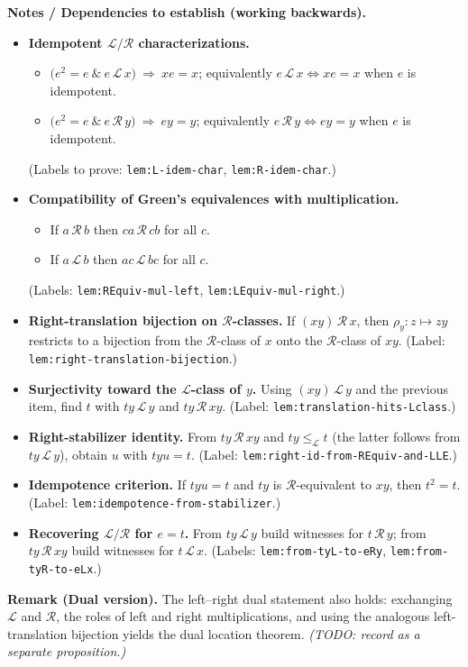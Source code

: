 \noindent\textbf{Notes / Dependencies to establish (working backwards).}
\begin{itemize}
  \item \textbf{Idempotent \(\mathcal L/\mathcal R\) characterizations.}
    \begin{itemize}
      \item \(\bigl(e^2=e \ \&\  e \,\mathcal L\, x\bigr)\ \Rightarrow\ x e = x\); equivalently \(e \,\mathcal L\, x \iff x e = x\) when \(e\) is idempotent.
      \item \(\bigl(e^2=e \ \&\  e \,\mathcal R\, y\bigr)\ \Rightarrow\ e y = y\); equivalently \(e \,\mathcal R\, y \iff e y = y\) when \(e\) is idempotent.
    \end{itemize}
    (Labels to prove: \texttt{lem:L-idem-char}, \texttt{lem:R-idem-char}.)
  \item \textbf{Compatibility of Green’s equivalences with multiplication.}
    \begin{itemize}
      \item If \(a \,\mathcal R\, b\) then \(c a \,\mathcal R\, c b\) for all \(c\).
      \item If \(a \,\mathcal L\, b\) then \(a c \,\mathcal L\, b c\) for all \(c\).
    \end{itemize}
    (Labels: \texttt{lem:REquiv-mul-left}, \texttt{lem:LEquiv-mul-right}.)
  \item \textbf{Right-translation bijection on \(\mathcal R\)-classes.}  
    If \((xy)\,\mathcal R\, x\), then \(\rho_y:z\mapsto zy\) restricts to a bijection from the \(\mathcal R\)-class of \(x\) onto the \(\mathcal R\)-class of \(xy\).  
    (Label: \texttt{lem:right-translation-bijection}.)
  \item \textbf{Surjectivity toward the \(\mathcal L\)-class of \(y\).}  
    Using \((xy)\,\mathcal L\, y\) and the previous item, find \(t\) with \(t y \,\mathcal L\, y\) and \(t y \,\mathcal R\, x y\).  
    (Label: \texttt{lem:translation-hits-Lclass}.)
  \item \textbf{Right-stabilizer identity.}  
    From \(t y \,\mathcal R\, x y\) and \(t y \le_{\mathcal L} t\) (the latter follows from \(t y \,\mathcal L\, y\)), obtain \(u\) with \(t y u = t\).  
    (Label: \texttt{lem:right-id-from-REquiv-and-LLE}.)
  \item \textbf{Idempotence criterion.}  
    If \(t y u = t\) and \(t y\) is \(\mathcal R\)-equivalent to \(x y\), then \(t^2 = t\).  
    (Label: \texttt{lem:idempotence-from-stabilizer}.)
  \item \textbf{Recovering \(\mathcal L/\mathcal R\) for \(e=t\).}  
    From \(t y \,\mathcal L\, y\) build witnesses for \(t \,\mathcal R\, y\); from \(t y \,\mathcal R\, x y\) build witnesses for \(t \,\mathcal L\, x\).  
    (Labels: \texttt{lem:from-tyL-to-eRy}, \texttt{lem:from-tyR-to-eLx}.)
\end{itemize}

\noindent\textbf{Remark (Dual version).}  
The left–right dual statement also holds: exchanging \(\mathcal L\) and \(\mathcal R\), the roles of left and right multiplications, and using the analogous left-translation bijection yields the dual location theorem. \emph{(TODO: record as a separate proposition.)}
